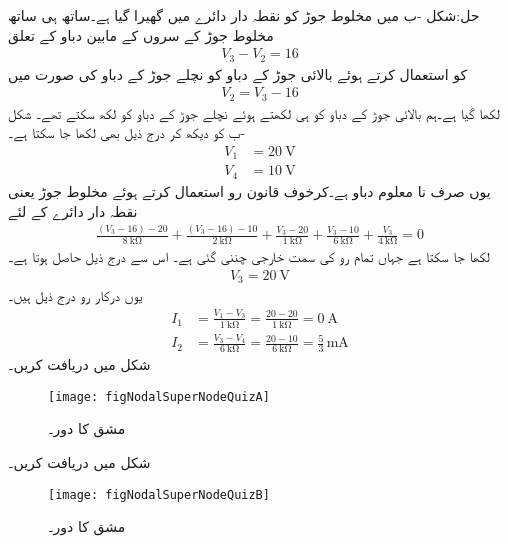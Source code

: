 حل:شکل -ب میں مخلوط جوڑ کو نقطہ دار دائرے میں گھیرا گیا ہے۔ساتھ ہی ساتھ مخلوط جوڑ کے سروں کے مابین دباو کے تعلق
\begin{align*}
V_3-V_2=16
\end{align*}
 کو استعمال کرتے ہوئے بالائی جوڑ کے دباو کو نچلے جوڑ کے دباو کی صورت میں
\begin{align*}
V_2=V_3-16
\end{align*}
 لکھا گیا ہے۔ہم بالائی جوڑ کے دباو کو  ہی لکھتے ہوئے نچلے جوڑ کے دباو کو  لکھ سکتے تھے۔ شکل -ب  کو دیکھ کر درج ذیل بھی لکھا جا سکتا ہے۔
\begin{align*}
V_1&=\SI{20}{\volt}\\
V_4&=\SI{10}{\volt}
\end{align*}
یوں صرف  نا معلوم دباو ہے۔کرخوف قانون رو استعمال کرتے ہوئے مخلوط جوڑ یعنی نقطہ دار دائرے کے لئے 
\begin{align*}
\frac{(V_3-16)-20}{\SI{8}{\kilo\ohm}}+\frac{(V_3-16)-10}{\SI{2}{\kilo\ohm}}+\frac{V_3-20}{\SI{1}{\kilo\ohm}}+\frac{V_3-10}{\SI{6}{\kilo\ohm}}+\frac{V_3}{\SI{4}{\kilo\ohm}}=0
\end{align*}
لکھا جا سکتا ہے جہاں تمام رو کی سمت خارجی چننی گئی ہے۔ اس سے درج ذیل حاصل ہوتا ہے۔
\begin{align*}
V_3=\SI{20}{\volt}
\end{align*}
یوں درکار رو درج ذیل ہیں۔
\begin{align*}
I_1&=\frac{V_1-V_3}{\SI{1}{\kilo\ohm}}=\frac{20-20}{\SI{1}{\kilo\ohm}}=\SI{0}{\ampere}\\
I_2&=\frac{V_3-V_4}{\SI{6}{\kilo\ohm}}=\frac{20-10}{\SI{6}{\kilo\ohm}}=\frac{5}{3}\,\si{\milli\ampere}
\end{align*}
شکل  میں  دریافت کریں۔
\begin{figure}
\centering
\texttt{[image: figNodalSuperNodeQuizA]}
\caption{مشق  کا دور۔}
\label{شکل_جوڑ_مشق_مخلوط_الف}
\end{figure}

شکل  میں  دریافت کریں۔
\begin{figure}
\centering
\texttt{[image: figNodalSuperNodeQuizB]}
\caption{مشق  کا دور۔}
\label{شکل_جوڑ_مشق_مخلوط_ب}
\end{figure}


